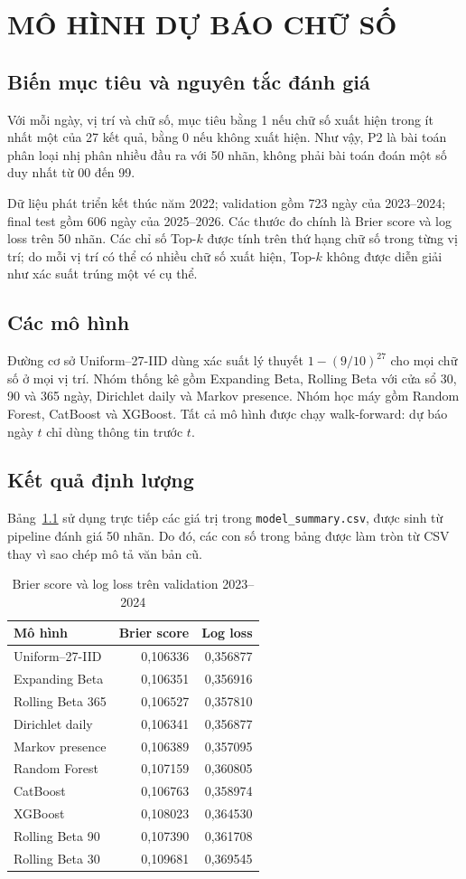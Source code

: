 \chapter{MÔ HÌNH DỰ BÁO CHỮ SỐ}
\section{Biến mục tiêu và nguyên tắc đánh giá}
Với mỗi ngày, vị trí và chữ số, mục tiêu bằng 1 nếu chữ số xuất hiện trong ít nhất một của 27 kết quả, bằng 0 nếu không xuất hiện. Như vậy, P2 là bài toán phân loại nhị phân nhiều đầu ra với 50 nhãn, không phải bài toán đoán một số duy nhất từ 00 đến 99.

Dữ liệu phát triển kết thúc năm 2022; validation gồm 723 ngày của 2023--2024; final test gồm 606 ngày của 2025--2026. Các thước đo chính là Brier score và log loss trên 50 nhãn. Các chỉ số Top-$k$ được tính trên thứ hạng chữ số trong từng vị trí; do mỗi vị trí có thể có nhiều chữ số xuất hiện, Top-$k$ không được diễn giải như xác suất trúng một vé cụ thể.

\section{Các mô hình}
Đường cơ sở Uniform--27-IID dùng xác suất lý thuyết $1-(9/10)^{27}$ cho mọi chữ số ở mọi vị trí. Nhóm thống kê gồm Expanding Beta, Rolling Beta với cửa sổ 30, 90 và 365 ngày, Dirichlet daily và Markov presence. Nhóm học máy gồm Random Forest, CatBoost và XGBoost. Tất cả mô hình được chạy walk-forward: dự báo ngày $t$ chỉ dùng thông tin trước $t$.

\section{Kết quả định lượng}
Bảng~\ref{tab:p2-validation} sử dụng trực tiếp các giá trị trong \texttt{model\_summary.csv}, được sinh từ pipeline đánh giá 50 nhãn. Do đó, các con số trong bảng được làm tròn từ CSV thay vì sao chép mô tả văn bản cũ.
\begin{table}[H]\centering\small
	\caption{Brier score và log loss trên validation 2023--2024}\label{tab:p2-validation}
	\begin{tabular}{lrr}\toprule
		Mô hình & Brier score & Log loss\\\midrule
		Uniform--27-IID & 0,106336 & 0,356877\\
		Expanding Beta & 0,106351 & 0,356916\\
		Rolling Beta 365 & 0,106527 & 0,357810\\
		Dirichlet daily & 0,106341 & 0,356877\\
		Markov presence & 0,106389 & 0,357095\\
		Random Forest & 0,107159 & 0,360805\\
		CatBoost & 0,106763 & 0,358974\\
		XGBoost & 0,108023 & 0,364530\\
		Rolling Beta 90 & 0,107390 & 0,361708\\
		Rolling Beta 30 & 0,109681 & 0,369545\\\bottomrule
\end{tabular}\end{table}

